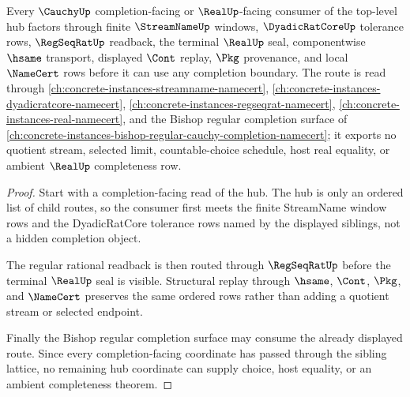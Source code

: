 \begin{theorem}
\label{thm:cauchy-top-level-completion-lattice-route}
Every $\CauchyUp$ completion-facing or $\RealUp$-facing consumer of the top-level hub factors through finite $\StreamNameUp$ windows, $\DyadicRatCoreUp$ tolerance rows, $\RegSeqRatUp$ readback, the terminal $\RealUp$ seal, componentwise $\hsame$ transport, displayed $\Cont$ replay, $\Pkg$ provenance, and local $\NameCert$ rows before it can use any completion boundary. The route is read through \autoref{ch:concrete-instances-streamname-namecert}, \autoref{ch:concrete-instances-dyadicratcore-namecert}, \autoref{ch:concrete-instances-regseqrat-namecert}, \autoref{ch:concrete-instances-real-namecert}, and the Bishop regular completion surface of \autoref{ch:concrete-instances-bishop-regular-cauchy-completion-namecert}; it exports no quotient stream, selected limit, countable-choice schedule, host real equality, or ambient $\RealUp$ completeness row.
\end{theorem}
\begin{proof}
Start with a completion-facing read of the hub. The hub is only an ordered list of child routes, so the consumer first meets the finite StreamName window rows and the DyadicRatCore tolerance rows named by the displayed siblings, not a hidden completion object.

The regular rational readback is then routed through $\RegSeqRatUp$ before the terminal $\RealUp$ seal is visible. Structural replay through $\hsame$, $\Cont$, $\Pkg$, and $\NameCert$ preserves the same ordered rows rather than adding a quotient stream or selected endpoint.

Finally the Bishop regular completion surface may consume the already displayed route. Since every completion-facing coordinate has passed through the sibling lattice, no remaining hub coordinate can supply choice, host equality, or an ambient completeness theorem.
\end{proof}
